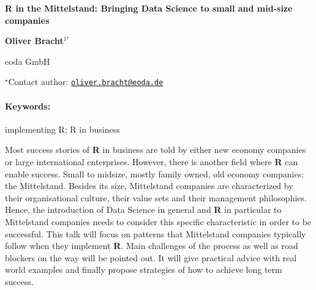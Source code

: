 \documentclass[11pt, a4paper]{article}
\renewcommand{\title}[1]{\begin{center}{\bf \LARGE #1}\end{center}}
\newcommand{\keywords}{\paragraph{Keywords:}}
\begin{document}
\pagestyle{empty}

\title{R in the Mittelstand: Bringing Data Science to small and mid-size
companies}

\begin{center}
  {\bf Oliver Bracht$^{1^\star}$}
\end{center}

\vskip 0.3cm

\begin{affiliations}
\begin{enumerate}
\begin{minipage}{0.915\textwidth}
\centering
\item eoda GmbH \\[-2pt]
\end{minipage}
\end{enumerate}
$^\star$Contact author: \href{mailto:oliver.bracht@eoda.de}{\nolinkurl{oliver.bracht@eoda.de}}\\
\end{affiliations}

\vskip 0.5cm

\begin{minipage}{0.915\textwidth}
\keywords implementing R; R in business
\end{minipage}

\vskip 0.8cm

Most success stories of \textbf{R} in business are told by either new
economy companies or large international enterprises. However, there is
another field where \textbf{R} can enable success. Small to midsize,
mostly family owned, old economy companies: the Mittelstand. Besides its
size, Mittelstand companies are characterized by their organisational
culture, their value sets and their management philosophies. Hence, the
introduction of Data Science in general and \textbf{R} in particular to
Mittelstand companies needs to consider this specific characteristic in
order to be successful. This talk will focus on patterns that
Mittelstand companies typically follow when they implement \textbf{R}.
Main challenges of the process as well as road blockers on the way will
be pointed out. It will give practical advice with real world examples
and finally propose strategies of how to achieve long term success.
\end{document}
